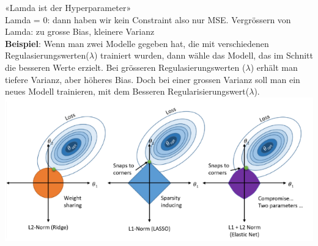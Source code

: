 «Lamda ist der Hyperparameter»\\
Lamda = 0: dann haben wir kein Constraint also nur MSE. Vergrössern von Lamda: zu grosse Bias, kleinere Varianz\\
\textbf{Beispiel}: Wenn man zwei Modelle gegeben hat, die mit verschiedenen Regulasierungswerten($\lambda$) trainiert wurden, dann wähle das Modell, das im Schnitt die besseren Werte erzielt. Bei grösseren Regulasierungswerten ($\lambda$) erhält man tiefere Varianz, aber höheres Bias. Doch bei einer grossen Varianz soll man ein neues Modell trainieren, mit dem Besseren Regularisierungswert($\lambda$).
\includegraphics[width=\linewidth]{img/l-norm.png}